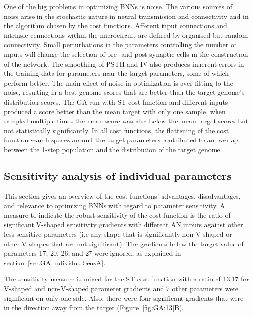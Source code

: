 One of the big problems in optimizing BNNs is noise.  The various sources
of noise arise in the stochastic nature in neural transmission and
connectivity and in the algorithm chosen by the cost functions. Afferent
input connections and intrinsic connections within the microcircuit are
defined by organised but random connectivity.  Small perturbations in the
parameters controlling the number of inputs will change the selection of
pre- and post-synaptic cells in the construction of the network.  The
smoothing of PSTH and IV also produces inherent errors in the training data
for parameters near the target parameters, some of which perform better.
The main effect of noise in optimization is over-fitting to the noise,
resulting in a best genome scores that are better than the target genome's
distribution scores.  The GA run with ST cost function and different inputs
produced a score better than the mean target with only one sample, when
sampled multiple times the mean score was also below the mean target scores
but not statistically significantly.  In all cost functions, the flattening
of the cost function search spaces around the target parameters contributed
to an overlap between the 1-step population and the distribution of the
target genome.

\subsection{Sensitivity analysis of individual parameters}

This section gives an overview of the cost functions' advantages,
disadvantages, and relevance to optimizing BNNs with regard to parameter
sensitivity.  A measure to indicate the robust sensitivity of the cost
function is the ratio of significant V-shaped sensitivity gradients with
different AN inputs against other less sensitive parameters (i.e any shape
that is significantly non-V-shaped or other V-shapes that are not
significant). The gradients below the target value of parameters 17, 20,
26, and 27 were ignored, as explained in
section~\ref{sec:GA:IndividualSensA}.

\smallskip{}

The sensitivity measure is mixed for the ST cost function with a ratio of
13:17 for V-shaped and non-V-shaped parameter gradients and 7 other
parameters were significant on only one side. Also, there were four
significant gradients that were in the direction away from the target
(Figure~\ref{fig:GA:13}B).

\smallskip{}


